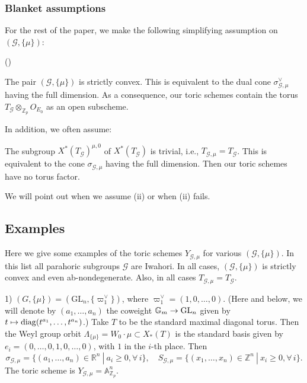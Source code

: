 \documentclass[reqno, 10pt]{amsart}
\makeatletter
\newcommand{\BA}{\ensuremath{\mathbb {A}}\xspace}
\newcommand{\BG}{\ensuremath{\mathbb {G}}\xspace}
\newcommand{\BR}{\ensuremath{\mathbb {R}}\xspace}
\newcommand{\BZ}{\ensuremath{\mathbb {Z}}\xspace}
\newcommand{\CG}{\ensuremath{\mathcal {G}}\xspace}
\DeclareMathOperator{\diag}{diag}
\newcommand{\GL}{\mathrm{GL}}
\theoremstyle{definition}
\newenvironment{altenumerate}
   {\begin{list}
      {\textup{(\theenumi)} }
      {\usecounter{enumi}
       \setlength{\labelwidth}{0pt}
       \setlength{\labelsep}{0pt}
       \setlength{\leftmargin}{0pt}
       \setlength{\itemsep}{\the\smallskipamount}
       \renewcommand{\theenumi}{\roman{enumi}}
      }}
   {\end{list}}
\numberwithin{equation}{subsection}
\numberwithin{subsubsection}{subsection}
\renewcommand{\to}{%
   \ifbool{@display}{\longrightarrow}{\rightarrow}%
   }
\let\shortmapsto\mapsto
\renewcommand{\mapsto}{%
   \ifbool{@display}{\shortmapsto}{\shortmapsto}%
   }
\makeatother
\begin{document}
 
 
 \subsubsection{Blanket assumptions}\label{blanket}
 For the rest of the paper, we  make the following simplifying assumption on $(\CG, \{\mu\})$:  
 \begin{altenumerate}
 \item The pair $(\CG, \{\mu\})$ is strictly convex.  This is equivalent to the dual cone $\sigma_{\CG, \mu}^\vee$ having the full dimension. As a consequence, our toric schemes contain the torus  $T_\CG\otimes_{\BZ_p}O_{E_0}$ as an open subscheme. 
 \vskip0.01in
 
In addition, we often assume:
 \vskip0.01in
 
 \item  The subgroup $X^*(T_\CG)^{\mu, 0}$ of  $X^*(T_\CG)$ is trivial, i.e., $T_{\CG, \mu}=T_\CG$. 
 This is equivalent to the cone $\sigma_{\CG, \mu}$ having the full dimension. Then our toric schemes have no torus factor. 

 \end{altenumerate}
 
 We will point out when we  assume (ii) or when (ii) fails. 
 

\subsection{Examples}\label{ss:Exam}


 Here we give some examples of the toric schemes $Y_{\CG,\mu}$ for various $(\CG,\{\mu\})$. In this list  all parahoric subgroups $\CG$ are Iwahori. In all cases, $(\CG, \{\mu\})$ is strictly convex and even ab-nondegenerate. Also, in all cases $T_{\CG, \mu}=T_\CG$. 
 \smallskip
 
 1) $(G,\{\mu\})=(\GL_n, \{\varpi_1^\vee\})$, where $\varpi^\vee_1=(1,0,\ldots, 0)$.
 (Here and below, we will denote by $(a_1,\ldots, a_n)$ the coweight $\BG_m\to \GL_n$ given by $t\mapsto \diag(t^{a_1},\ldots , t^{a_n})$.)
  Take $T$ to be the standard maximal diagonal torus. Then the Weyl group orbit $\Lambda_{\{\mu\}}=W_0\cdot \mu\subset X_*(T)$ is  the  standard basis  given by $e_i=(0,\ldots,0,1,0,\ldots, 0)$, with $1$ in the $i$-th place. Then
 \[
 \sigma_{\CG,\mu}=\{(a_1,\ldots, a_n)\in\BR^n\ |\ a_i\geq 0, \forall\, i\}, \quad S_{\CG,\mu}=\{(x_1,\ldots, x_n)\in\BZ^n\ |\ x_i\geq 0, \forall\, i\} .
 \] 
 The toric scheme is $Y_{\CG,\mu}=\BA^n_{\BZ_p}$.
 \smallskip
 
\end{document}
